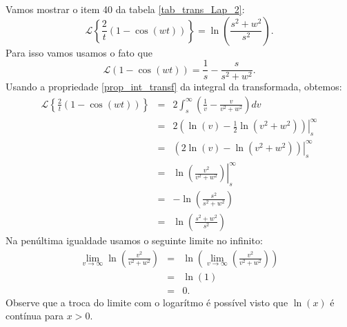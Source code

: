 \begin{ex}Vamos mostrar o item 40 da tabela \ref{tab_trans_Lap_2}:
\begin{equation}
\mathcal{L}\left\{\frac{2}{t}\left(1-\cos(wt)\right)\right\}=\ln\left(\frac{s^2+w^2}{s^2}\right).
\end{equation}
Para isso vamos usamos o fato que
\begin{equation*}
\mathcal{L}\left(1-\cos(wt)\right)=\frac{1}{s}-\frac{s}{s^2+w^2}.
\end{equation*}
Usando a propriedade \ref{prop_int_transf} da integral da transformada, obtemos:
\begin{eqnarray*}
\mathcal{L}\left\{\frac{2}{t}\left(1-\cos(wt)\right)\right\}&=&2\int_s^\infty \left(\frac{1}{v}-\frac{v}{v^2+w^2}\right)dv\\
&=& \left.2\left(\ln(v)-\frac{1}{2}\ln(v^2+w^2)\right)\right|_s^\infty\\
&=& \left.\left(2\ln(v)-\ln(v^2+w^2)\right)\right|_s^\infty\\
&=&\left.\ln\left(\frac{v^2}{v^2+w^2}\right)\right|_s^\infty\\
&=&-\ln\left(\frac{s^2}{s^2+w^2}\right)\\
&=&\ln\left(\frac{s^2+w^2}{s^2}\right)
\end{eqnarray*}
Na penúltima igualdade usamos o seguinte limite no infinito:
\begin{eqnarray*}
\lim_{v\to\infty} \ln\left(\frac{v^2}{v^2+w^2}\right)&=& \ln\left(\lim_{v\to\infty}\left(\frac{v^2}{v^2+w^2}\right)\right)\\
&=& \ln\left(1\right)\\
&=&0.
\end{eqnarray*}
Observe que a troca do limite com o logarítmo é possível visto que $\ln(x)$ é contínua para $x>0$.
\end{ex}
